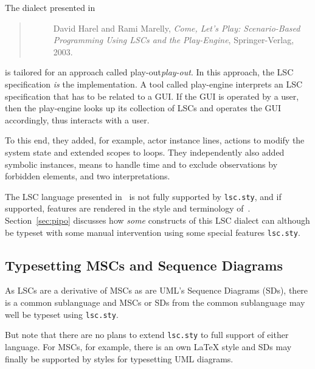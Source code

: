 \documentclass{article}
\newcommand{\sty}[1]{\texttt{#1.sty}}
\newcommand{\lscsty}{\sty{lsc}}
\begin{document}
\medskip



The dialect presented in
%
\begin{quote}
\small
\begin{description}
\item[\cite{HarelMarelly2003}]
  David Harel and Rami Marelly,
  \emph{Come, Let's Play: Scenario-Based Programming Using LSCs and the Play-Engine},
  Springer-Verlag, 2003.
\end{description}
\end{quote}
%
is tailored for an approach called 
play-out\emph{play-out}. 
%
In this approach, the LSC specification \emph{is} the implementation.  A tool
called 
play-engine interprets an LSC specification that has to be related to a
GUI.  If the GUI is operated by a user, then the play-engine looks up its
collection of LSCs and operates the GUI accordingly, thus interacts with a
user.

To this end, they added, for example, 
actor instance lines, 
actions to modify the system state and extended 
scopes to 
loops.
%
They independently also added 
symbolic instances, means to handle 
time and to 
exclude observations by 
forbidden elements, and two 
interpretations.

The LSC language presented in~\cite{HarelMarelly2003} is not fully supported
by \lscsty, and if supported, features are rendered in the 
style and terminology of~\cite{Klose2003}.
%
Section~\ref{sec:pipo} discusses how \emph{some} constructs of this LSC
dialect can although be typeset with some 
manual intervention using some special features \lscsty.

\subsection{Typesetting MSCs and Sequence Diagrams}

As LSCs are a derivative of MSCs as are 
UML's 
Sequence Diagrams (SDs), there is a 
common sublanguage and MSCs or SDs from the common sublanguage may well be
typeset using \lscsty.

But note that there are no plans to extend \lscsty{} to full support of
either language.
%
For MSCs, for example, there is an own \LaTeX{} style and SDs may finally be
supported by styles for typesetting UML diagrams.
\end{document}

